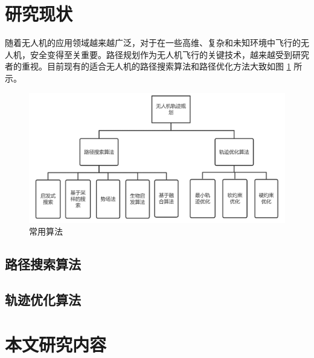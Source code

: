 \section{研究现状}

随着无人机的应用领域越来越广泛，对于在一些高维、复杂和未知环境中飞行的无人机，安全变得至关重要。路径规划作为无人机飞行的关键技术，越来越受到研究者的重视。目前现有的适合无人机的路径搜索算法和路径优化方法大致如图 \ref{fig2} 所示。
\begin{figure}[H]
    \vspace{12pt}
    \centering
    \includegraphics[width=12cm]{figures/fig2.png}
    \caption{
        常用算法
    }
    \label{fig2}
\end{figure}

\subsection{路径搜索算法}



\subsection{轨迹优化算法}


\section{本文研究内容}





\endinput

